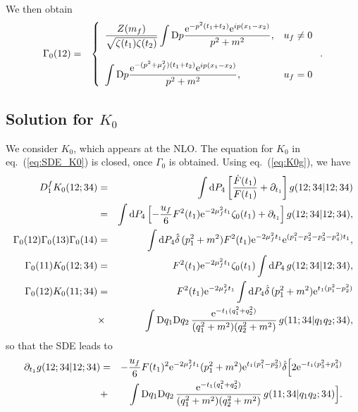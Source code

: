 \documentclass[preprint]{ptephy_v1}%
\newcommand{\rme}{{\rm e}}
\newcommand{\rmd}{{\rm d}}
\newcommand{\rmD}{{\rm D}}
\begin{document}
We then obtain
\begin{eqnarray}
\Gamma_0(12) &=& \left\{
\begin{array}{ll}
\displaystyle \dfrac{Z(m_f)}{\sqrt{\zeta(t_1)\zeta(t_2)} } \int \rmD p \dfrac{\rme^{-p^2(t_1+t_2)}\rme^{ip(x_1-x_2)}} {p^2+m^2}, & u_f \not= 0 \\
\\
\displaystyle \int \rmD p \dfrac{\rme^{-(p^2+\mu_f^2)(t_1+t_2)}\rme^{ip(x_1-x_2)}} {p^2+m^2}, & u_f=0 \\
\end{array}
\right. .
\end{eqnarray}


\subsection{Solution for $K_0$}
We consider $K_0$, which appears at the NLO.
The equation for $K_0$ in eq.~(\ref{eq:SDE_K0}) is closed, once $\Gamma_0$ is obtained.
Using eq.~(\ref{eq:K0g}),
we have
\begin{eqnarray}
D_1^f K_0(12;34) &=& \int  \rmd P_4 \left[ \frac{\dot F(t_1)}{F(t_1)} +\partial_{t_1}\right] g(12;34\vert 12;34)\nonumber \\
&=& \int  \rmd P_4 \left[ -\frac{u_f}{6} F^2(t_1)\rme^{-2\mu_f^2 t_1}\zeta_0(t_1) +\partial_{t_1}\right] g(12;34\vert 12;34), \\
\Gamma_0(12) \Gamma_0(13) \Gamma_0(14) &=& \int  \rmd P_4 \hat\delta\, (p_1^2+m^2) F^2(t_1) \rme^{-2\mu_f^2 t_1} \rme^{(p_1^2-p_2^2-p_3^2-p_4^2)t_1}, \\
\Gamma_0(11) K_0(12;34) &=& F^2(t_1) \rme^{-2\mu_f^2 t_1} \zeta_0(t_1)\int  \rmd P_4\, g(12;34\vert 12;34),\\
\Gamma_0(12) K_0(11;34) &=& F^2(t_1) \rme^{-2\mu_f^2 t_1} \int  \rmd P_4\hat\delta\, (p_1^2+m^2) \rme^{t_1(p_1^2-p_2^2)} \nonumber \\
&\times& \int \rmD q_1\rmD q_2\, \frac{\rme^{-t_1(q_1^2+q_2^2)}}{(q_1^2+m^2)(q_2^2+m^2)}\, g(11;34\vert q_1q_2;34), 
\end{eqnarray}
so that the SDE leads to
\begin{eqnarray}
\partial_{t_1} g(12;34\vert 12;34) &=& -\frac{u_f}{6}F(t_1)^2 \rme^{-2\mu_f^2 t_1} (p_1^2+m^2)\rme^{t_1(p_1^2-p_2^2)} \hat\delta \Bigl[ 2\rme^{-t_1(p_3^2+p_4^2)}\nonumber \\
&+& \int \rmD q_1\rmD q_2\, \frac{\rme^{-t_1(q_1^2+q_2^2)}}{(q_1^2+m^2)(q_2^2+m^2)}\, g(11;34\vert q_1q_2;34) \Bigr].
\label{eq:SDE_g}
\end{eqnarray}
\end{document}
